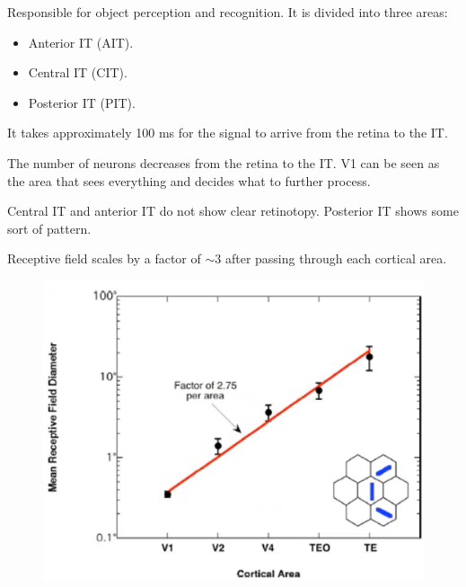 Responsible for object perception and recognition.
It is divided into three areas:
\begin{itemize}
    \item Anterior IT (AIT).
    \item Central IT (CIT).
    \item Posterior IT (PIT).
\end{itemize}

\begin{remark}
    It takes approximately 100 ms for the signal to arrive from the retina to the IT.
\end{remark}

\begin{remark}
    The number of neurons decreases from the retina to the IT.
    V1 can be seen as the area that sees everything and decides what to further process.
\end{remark}

\begin{remark}
    Central IT and anterior IT do not show clear retinotopy.
    Posterior IT shows some sort of pattern.
\end{remark}

\begin{remark}
    Receptive field scales by a factor of $\sim 3$ after passing through each cortical area.
    \begin{figure}[H]
        \centering
        \includegraphics[width=0.4\linewidth]{./img/receptive_field_growth.png}
    \end{figure}
\end{remark}

